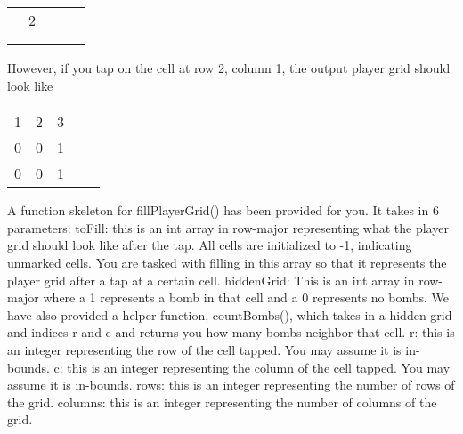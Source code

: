 \documentclass{article}
\begin{document}
\begin{enumerate}[label=(\alph*), itemsep = 120pt]
     \begin{center}
    \begin{tabular}{ | c | c | c | c | c |}
    \hline
       &  &  &  &  \\
      \hline
       & 2 &  &  &  \\
      \hline
       &  & &  &  \\
      \hline
       &  &  & &  \\
      \hline
    \end{tabular}
    \end{center}

    However, if you tap on the cell at row 2, column 1, the output player grid should look like 

     \begin{center}
    \begin{tabular}{ | c | c | c | c | c |}
    \hline
       &  &  &  &  \\
      \hline
       1& 2 & 3 &  &  \\
      \hline
       0 &  0 &  1&  &  \\
      \hline
       0 & 0 &  1&  &  \\
      \hline
    \end{tabular}
    \end{center}

    A function skeleton for fillPlayerGrid() has been provided for you. It takes in 6 parameters: \newline \newline
    toFill: this is an int array in row-major representing what the player grid should look like after the tap. All cells are initialized to -1, indicating unmarked cells. You are tasked with filling in this array so that it represents the player grid after a tap at a certain cell. \newline \newline
    hiddenGrid: This is an int array in row-major where a 1 represents a bomb in that cell and a 0 represents no bombs. 
    We have also provided a helper function, countBombs(), which takes in a hidden grid and indices r and c and returns you how many bombs neighbor that cell.  \newline \newline
    r: this is an integer representing the row of the cell tapped. You may assume it is in-bounds. \newline \newline
    c: this is an integer representing the column of the cell tapped. You may assume it is in-bounds.\newline \newline
    rows: this is an integer representing the number of rows of the grid. \newline \newline
    columns: this is an integer representing the number of columns of the grid.
    

\end{enumerate}
\end{document}
